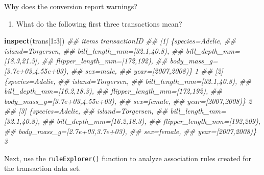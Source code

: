 \documentclass[
  notitlepage]{book}
\newenvironment{Shaded}{\begin{snugshade}}{\end{snugshade}}
\newcommand{\CommentTok}[1]{\textcolor[rgb]{0.56,0.35,0.01}{\textit{#1}}}
\newcommand{\DecValTok}[1]{\textcolor[rgb]{0.00,0.00,0.81}{#1}}
\newcommand{\KeywordTok}[1]{\textcolor[rgb]{0.13,0.29,0.53}{\textbf{#1}}}
\newcommand{\NormalTok}[1]{#1}
\newcommand{\OperatorTok}[1]{\textcolor[rgb]{0.81,0.36,0.00}{\textbf{#1}}}
\providecommand{\tightlist}{%
  \setlength{\itemsep}{0pt}\setlength{\parskip}{0pt}}
\begin{document}
Why does the conversion report warnings?

\begin{enumerate}
\def\labelenumi{\arabic{enumi}.}
\setcounter{enumi}{1}
\tightlist
\item
  What do the following first three transactions mean?
\end{enumerate}

\begin{Shaded}
\begin{Highlighting}[]
\KeywordTok{inspect}\NormalTok{(trans[}\DecValTok{1}\OperatorTok{:}\DecValTok{3}\NormalTok{])}
\CommentTok{\#\#     items                             transactionID}
\CommentTok{\#\# [1] \{species=Adelie,                               }
\CommentTok{\#\#      island=Torgersen,                             }
\CommentTok{\#\#      bill\_length\_mm=[32.1,40.8),                   }
\CommentTok{\#\#      bill\_depth\_mm=[18.3,21.5],                    }
\CommentTok{\#\#      flipper\_length\_mm=[172,192),                  }
\CommentTok{\#\#      body\_mass\_g=[3.7e+03,4.55e+03),               }
\CommentTok{\#\#      sex=male,                                     }
\CommentTok{\#\#      year=[2007,2008)\}                            1}
\CommentTok{\#\# [2] \{species=Adelie,                               }
\CommentTok{\#\#      island=Torgersen,                             }
\CommentTok{\#\#      bill\_length\_mm=[32.1,40.8),                   }
\CommentTok{\#\#      bill\_depth\_mm=[16.2,18.3),                    }
\CommentTok{\#\#      flipper\_length\_mm=[172,192),                  }
\CommentTok{\#\#      body\_mass\_g=[3.7e+03,4.55e+03),               }
\CommentTok{\#\#      sex=female,                                   }
\CommentTok{\#\#      year=[2007,2008)\}                            2}
\CommentTok{\#\# [3] \{species=Adelie,                               }
\CommentTok{\#\#      island=Torgersen,                             }
\CommentTok{\#\#      bill\_length\_mm=[32.1,40.8),                   }
\CommentTok{\#\#      bill\_depth\_mm=[16.2,18.3),                    }
\CommentTok{\#\#      flipper\_length\_mm=[192,209),                  }
\CommentTok{\#\#      body\_mass\_g=[2.7e+03,3.7e+03),                }
\CommentTok{\#\#      sex=female,                                   }
\CommentTok{\#\#      year=[2007,2008)\}                            3}
\end{Highlighting}
\end{Shaded}

Next, use the \texttt{ruleExplorer()} function to analyze association rules
created for the transaction data set.
\end{document}
